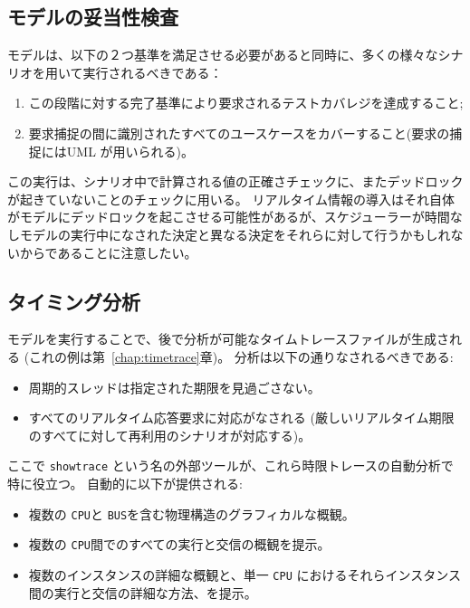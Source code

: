 \documentclass[\pformat,12pt]{jreport}
\begin{document}
\subsection{モデルの妥当性検査}

モデルは、以下の２つ基準を満足させる必要があると同時に、多くの様々なシナリオを用いて実行されるべきである：

\begin{enumerate}
\item この段階に対する完了基準により要求されるテストカバレジを達成すること;
\item 要求捕捉の間に識別されたすべてのユースケースをカバーすること(要求の捕捉にはUML が用いられる)。
\end{enumerate}

この実行は、シナリオ中で計算される値の正確さチェックに、またデッドロックが起きていないことのチェックに用いる。
リアルタイム情報の導入はそれ自体がモデルにデッドロックを起こさせる可能性があるが、スケジューラーが時間なしモデルの実行中になされた決定と異なる決定をそれらに対して行うかもしれないからであることに注意したい。

\subsection{タイミング分析}

モデルを実行することで、後で分析が可能なタイムトレースファイルが生成される (これの例は第~\ref{chap:timetrace}章)。 
分析は以下の通りなされるべきである:

\begin{itemize}
\item 周期的スレッドは指定された期限を見過ごさない。
\item すべてのリアルタイム応答要求に対応がなされる (厳しいリアルタイム期限のすべてに対して再利用のシナリオが対応する)。
\end{itemize}

ここで \texttt{showtrace} という名の外部ツールが、これら時限トレースの自動分析で特に役立つ。
自動的に以下が提供される:
\begin{itemize}
\item 複数の \texttt{CPU}と \texttt{BUS}を含む物理構造のグラフィカルな概観。
\item 複数の \texttt{CPU}間でのすべての実行と交信の概観を提示。
\item 複数のインスタンスの詳細な概観と、単一 \texttt{CPU} におけるそれらインスタンス間の実行と交信の詳細な方法、を提示。
\end{itemize}
\end{document}
